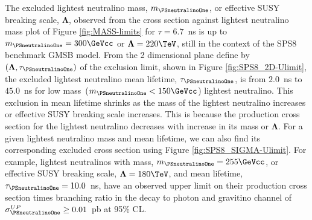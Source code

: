 The excluded lightest neutralino mass, $m_{\PSneutralinoOne}$, or effective SUSY breaking scale, $\mathbf{\Lambda}$, observed from the cross section against lightest neutralino mass plot of Figure \ref{fig:MASS-limits} for $\tau = 6.7$~ns is up to  $m_{\PSneutralinoOne} = 300\GeVcc$ or  $\mathbf{\Lambda} = 220\TeV$, still in the context of the SPS8 benchmark GMSB model.
\newline
From the 2 dimensional plane define by $(\mathbf{\Lambda},\tau_{\PSneutralinoOne})$ of the exclusion limit, shown in  Figure \ref{fig:SPS8_2D-Ulimit}, the excluded lightest neutralino mean lifetime, $\tau_{\PSneutralinoOne}$, is from $2.0$~ns to $45.0$~ns for low mass~($m_{\PSneutralinoOne} < 150\GeVcc$) lightest neutralino. This exclusion in mean lifetime shrinks as the mass of the lightest neutralino increases or effective SUSY breaking scale increases. This is because the production cross section for the lightest neutralino decreases with increase in its mass or $\mathbf{\Lambda}$. 
\newline
For a given lightest neutralino mass and mean lifetime, we can also find its corresponding excluded cross section using Figure \ref{fig:SPS8_SIGMA-Ulimit}. For example, lightest neutralinos with mass,  $m_{\PSneutralinoOne} = 255\GeVcc$, or effective SUSY breaking scale,  $\mathbf{\Lambda} = 180\TeV$, and mean lifetime, $\tau_{\PSneutralinoOne} = 10.0$~ns, have an observed upper limit on their production cross section times branching ratio in the decay to photon and gravitino channel of $\sigma^{UP}_{\PSneutralinoOne} \geq 0.01$~pb at 95\% CL.

